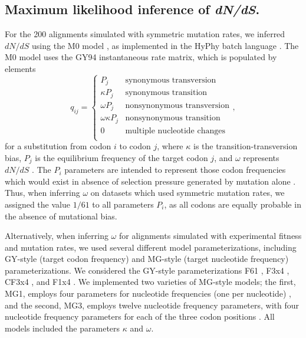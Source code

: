 \documentclass[11pt]{article}
\begin{document}
\subsection*{Maximum likelihood inference of \emph{dN/dS}.}
For the 200 alignments simulated with symmetric mutation rates, we inferred $dN/dS$ using the M0 model \citep{Yangetal2000}, as implemented in the HyPhy batch language \citep{KosakovskyPondetal2005}. The M0 model uses the GY94 instantaneous rate matrix, which is populated by elements
\begin{equation}\label{eq:GY94}
q_{ij} = \left\{ 
	\begin{array}{rl}
	P_j                &\text{synonymous transversion} \\
	\kappa P_j           &\text{synonymous transition} \\
 	\omega P_j           &\text{nonsynonymous transversion} \\
 	\omega \kappa P_j    &\text{nonsynonymous transition} \\
	0                    &\text{multiple nucleotide changes} \\             
	\end{array} \right.,
\end{equation} for a substitution from codon $i$ to codon $j$, where $\kappa$ is the transition-transversion bias, $P_j$ is the equilibrium frequency of the target codon $j$, and $\omega$ represents $dN/dS$ \citep{GoldmanYang1994,NielsenYang1998}. The $P_i$ parameters are intended to represent those codon frequencies which would exist in absence of selection pressure generated by mutation alone \citep{GoldmanYang1994,MuseGaut1994,YN00,Yang2006}. Thus, when inferring $\omega$ on datasets which used symmetric mutation rates, we assigned the value $1/61$ to all parameters $P_i$, as all codons are  equally probable in the absence of mutational bias.

Alternatively, when inferring $\omega$ for alignments simulated with experimental fitness and mutation rates, we used several different model parameterizations, including GY-style \citep{GoldmanYang1994} (target codon frequency) and MG-style \citep{MuseGaut1994} (target nucleotide frequency) parameterizations. We considered the GY-style parameterizations F61 \citep{GoldmanYang1994}, F3x4 \citep{GoldmanYang1994}, CF3x4 \citep{KosakovskyPond2010}, and F1x4 \citep{MuseGaut1994}. We implemented two varieties of MG-style models; the first, MG1, employs four parameters for nucleotide frequencies (one per nucleotide) \citep{MuseGaut1994}, and the second, MG3, employs twelve nucleotide frequency parameters, with four nucleotide frequency parameters for each of the three codon positions \citep{KosakovskyPondMuse2005}. All models included the parameters $\kappa$ and $\omega$. 
\end{document}
